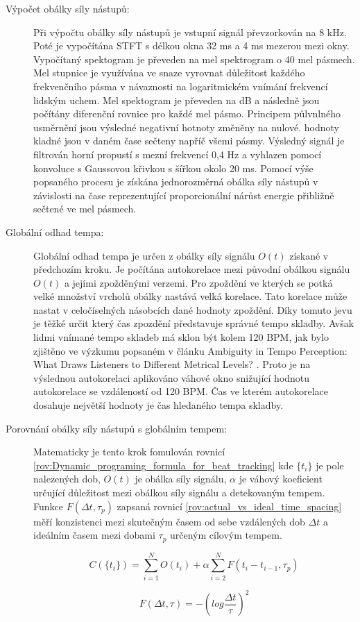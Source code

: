     \begin{description}
      \item[Výpočet obálky síly nástupů:] Při výpočtu obálky síly nástupů je vstupní signál převzorkován na 8 kHz. Poté je vypočítána \acs{STFT} s délkou okna 32 ms a 4 ms mezerou mezi okny. Vypočítaný spektogram je převeden na mel spektrogram o 40 mel pásmech. Mel stupnice je využívána ve snaze vyrovnat důležitost každého frekvenčního pásma v návaznosti na logaritmickém vnímání frekvencí lidským uchem. Mel spektogram je převeden na dB a následně jsou počítány diferenční rovnice pro každé mel pásmo. Principem půlvnlného usměrnění jsou výsledné negativní hotnoty změněny na nulové. hodnoty kladné jsou v daném čase sečteny napříč všemi pásmy. Výsledný signál je filtrován horní propustí s mezní frekvencí 0,4 Hz a vyhlazen pomocí konvoluce s Gaussovou křivkou s šířkou okolo 20 ms. Pomocí výše popsaného procesu je získána jednorozměrná obálka síly nástupů v závislosti na čase reprezentující proporcionální nárůst energie přibližně sečtené ve mel pásmech.
      \item[Globální odhad tempa:] Globální odhad tempa je určen z obálky síly signálu $O(t)$ získané v předchozím kroku. Je počítána autokorelace mezi původní obálkou signálu $O(t)$ a jejími zpožděnými verzemi. Pro zpoždění ve kterých se potká velké množství vrcholů obálky nastává velká korelace. Tato korelace může nastat v celočíselných násobcích dané hodnoty zpoždění. Díky tomuto jevu je těžké určit který čas zpozdění představuje správné tempo skladby. Avšak lidmi vnímané tempo skladeb má sklon být kolem 120 \acs{BPM}, jak bylo zjištěno ve výzkumu popsaném v článku Ambiguity in Tempo Perception: What Draws Listeners to Different Metrical Levels? \cite{Ambiguity_in_tempo_perception}. Proto je na výslednou autokorelaci aplikováno váhové okno snižující hodnotu autokorelace se vzdáleností od 120 BPM. Čas ve kterém autokorelace dosahuje největší hodnoty je čas hledaného tempa skladby.  
      \item[Porovnání obálky síly nástupů s globálním tempem:] Matematicky je tento krok fomulován rovnicí \ref{rov:Dynamic_programing_formula_for_beat_tracking} kde $ \{t_i\} $ je pole nalezených dob, $O(t)$ je obálka síly signálu, $\alpha$ je váhový koeficient určující důležitost mezi obálkou síly signálu a detekovaným tempem. Funkce $F(\Delta t, \tau_p)$ zapsaná rovnicí \ref{rov:actual_vs_ideal_time_spacing} měří konzistenci mezi skutečným časem od sebe vzdálených dob $\Delta t$ a ideálním časem mezi dobami $ \tau_p$ určeným cílovým tempem.

      \begin{equation}
        C(\{t_i\}) = \sum_{i = 1}^{N} O(t_i) + \alpha \sum_{i = 2}^{N} F(t_i - t_{i-1}, \tau_p)
        \label{rov:Dynamic_programing_formula_for_beat_tracking}
      \end{equation}
  
      \begin{equation}
        F(\Delta t, \tau) = -(log \frac{\Delta t}{\tau})^2
        \label{rov:actual_vs_ideal_time_spacing}
      \end{equation}
    \end{description}
    
